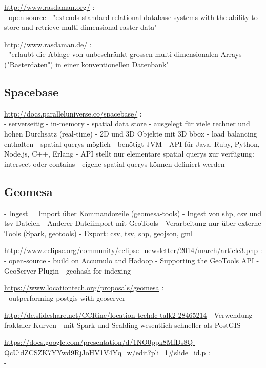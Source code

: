 \url{http://www.rasdaman.org/} :\\
- open-source
- "extends standard relational database systems with the ability to store and retrieve multi-dimensional raster data"


\url{http://www.rasdaman.de/} :\\
- "erlaubt die Ablage von unbeschränkt grossen multi-dimensionalen Arrays ("Rasterdaten") in einer konventionellen Datenbank"


\subsection{Spacebase}

\url{http://docs.paralleluniverse.co/spacebase/} :\\
- serverseitig
- in-memory
- spatial data store
- ausgelegt für viele rechner und hohen Durchsatz (real-time)
- 2D und 3D Objekte mit 3D bbox
- load balancing enthalten
- spatial querys möglich
- benötigt JVM
- API für Java, Ruby, Python, Node.js, C++, Erlang
- API stellt nur elementare spatial querys zur verfügung: intersect oder contains
- eigene spatial querys können definiert werden

\subsection{Geomesa}

- Ingest = Import über Kommandozeile (geomesa-tools)
- Ingest von shp, csv und tsv Dateien
- Anderer Dateiimport mit GeoTools
- Verarbeitung nur über externe Tools (Spark, geotools)
- Export: csv, tsv, shp, geojson, gml

\url{http://www.eclipse.org/community/eclipse_newsletter/2014/march/article3.php} :\\
- open-source
- build on Accumulo and Hadoop
- Supporting the GeoTools API
- GeoServer Plugin
- geohash for indexing


\url{https://www.locationtech.org/proposals/geomesa} :\\
- outperforming postgis with geoserver


\url{http://de.slideshare.net/CCRinc/location-techdc-talk2-28465214}
- Verwendung fraktaler Kurven
- mit Spark und Scalding wesentlich schneller als PostGIS


\url{https://docs.google.com/presentation/d/1NO0ppk8MfDs8Q-QcUidZCSZK7YYwd9RjJoHV1V4Yq_w/edit?pli=1#slide=id.p} :\\
- 



